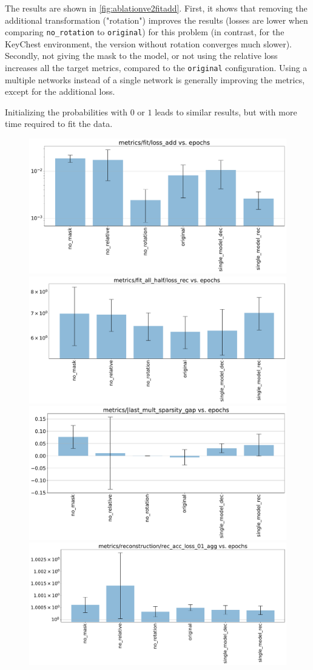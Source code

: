 \documentclass[a4paper,11pt,oneside]{report}
\begin{document}
The results are shown in \autoref{fig:ablationve2fitadd}. First, it shows that removing the additional transformation ("rotation") improves the results (losses are lower when comparing {\tt no\_rotation} to {\tt original}) for this problem (in contrast, for the KeyChest environment, the version without rotation converges much slower).
Secondly, not giving the mask to the model, or not using the relative loss increases all the target metrics, compared to the {\tt original} configuration.
Using a multiple networks instead of a single network is generally improving the metrics, except for the additional loss.

Initializing the probabilities with $0$ or $1$ leads to similar results, but with more time required to fit the data.

\begin{figure}
    \centering
    \includegraphics[width=0.6\linewidth]{plots/ablation_ve2_fitadd}
    \includegraphics[width=0.6\linewidth]{plots/ablation_ve2_half_fit}
    \includegraphics[width=0.6\linewidth]{plots/ablation_ve2_mult_sparsity_gap}
    \includegraphics[width=0.6\linewidth]{plots/ablation_ve2_reconstruction_acc}

\end{figure}
\end{document}
